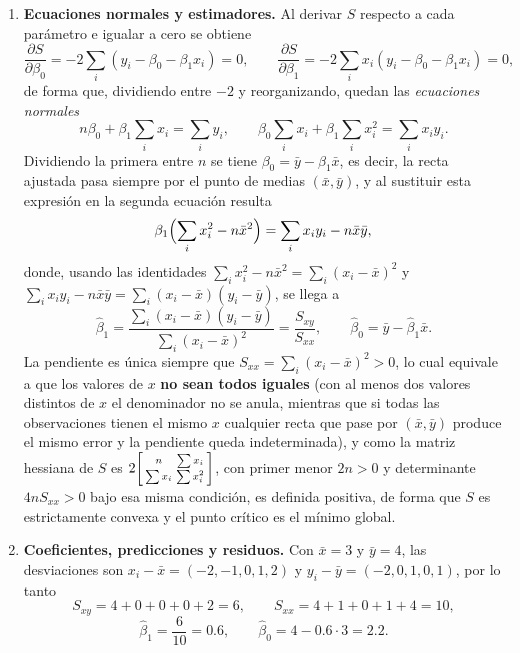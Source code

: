 \begin{enumerate}

\item \textbf{Ecuaciones normales y estimadores.}
Al derivar $S$ respecto a cada parámetro e igualar a cero se obtiene
\[
    \frac{\partial S}{\partial \beta_0} = -2\sum_i (y_i-\beta_0-\beta_1x_i) = 0,
    \qquad
    \frac{\partial S}{\partial \beta_1} = -2\sum_i x_i(y_i-\beta_0-\beta_1x_i) = 0,
\]
de forma que, dividiendo entre $-2$ y reorganizando, quedan las
\emph{ecuaciones normales}
\[
    n\beta_0 + \beta_1\sum_i x_i = \sum_i y_i,
    \qquad
    \beta_0\sum_i x_i + \beta_1\sum_i x_i^2 = \sum_i x_iy_i .
\]
Dividiendo la primera entre $n$ se tiene $\beta_0=\bar y-\beta_1\bar x$, es
decir, la recta ajustada pasa siempre por el punto de medias
$(\bar x,\bar y)$, y al sustituir esta expresión en la segunda ecuación
resulta
\[
    \beta_1\Bigl(\sum_i x_i^2 - n\bar x^2\Bigr) = \sum_i x_iy_i - n\bar x\bar y ,
\]
donde, usando las identidades
$\sum_i x_i^2-n\bar x^2=\sum_i(x_i-\bar x)^2$ y
$\sum_i x_iy_i-n\bar x\bar y=\sum_i(x_i-\bar x)(y_i-\bar y)$, se llega a
\[
    \hat\beta_1 = \frac{\sum_i (x_i-\bar x)(y_i-\bar y)}{\sum_i (x_i-\bar x)^2}
    = \frac{S_{xy}}{S_{xx}},
    \qquad
    \hat\beta_0 = \bar y - \hat\beta_1\bar x .
\]
La pendiente es única siempre que $S_{xx}=\sum_i(x_i-\bar x)^2>0$, lo
cual equivale a que los valores de $x$ \textbf{no sean todos iguales}
(con al menos dos valores distintos de $x$ el denominador no se anula,
mientras que si todas las observaciones tienen el mismo $x$ cualquier
recta que pase por $(\bar x,\bar y)$ produce el mismo error y la
pendiente queda indeterminada), y como la matriz hessiana de $S$ es
$2\begin{bsmallmatrix} n & \sum x_i\\ \sum x_i & \sum x_i^2\end{bsmallmatrix}$,
con primer menor $2n>0$ y determinante $4nS_{xx}>0$ bajo esa misma
condición, es definida positiva, de forma que $S$ es estrictamente convexa
y el punto crítico es el mínimo global.

\item \textbf{Coeficientes, predicciones y residuos.}
Con $\bar x=3$ y $\bar y=4$, las desviaciones son
$x_i-\bar x=(-2,-1,0,1,2)$ y $y_i-\bar y=(-2,0,1,0,1)$, por lo tanto
\[
    S_{xy} = 4+0+0+0+2 = 6, \qquad S_{xx} = 4+1+0+1+4 = 10,
\]
\[
    \hat\beta_1 = \frac{6}{10} = 0.6, \qquad
    \hat\beta_0 = 4 - 0.6\cdot 3 = 2.2 .
\]


\end{enumerate}
